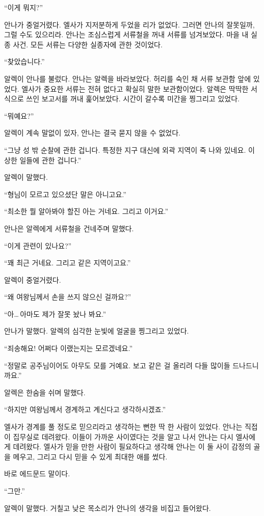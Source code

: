 ``이게 뭐지?''

안나가 중얼거렸다. 엘사가 지저분하게 두었을 리가 없었다. 그러면 안나의 잘못일까, 그럴 수도 있으리라. 안나는 조심스럽게 서류철을 꺼내 서류를 넘겨보았다. 마을 내 실종 사건. 모든 서류는 다양한 실종자에 관한 것이었다.

``찾았습니다.''

알렉이 안나를 불렀다. 안나는 알렉을 바라보았다. 허리를 숙인 채 서류 보관함 앞에 있었다. 엘사가 중요한 서류는 전혀 없다고 확실히 말한 보관함이었다. 알렉은 딱딱한 서식으로 쓰인 보고서를 꺼내 훑어보았다. 시간이 갈수록 미간을 찡그리고 있었다.

``뭐예요?''

알렉이 계속 말없이 있자, 안나는 결국 묻지 않을 수 없었다.

``그냥 성 밖 순찰에 관한 겁니다. 특정한 지구 대신에 외곽 지역이 죽 나와 있네요. 이상한 일들에 관한 겁니다.''

알렉이 말했다.

``형님이 모르고 있으셨단 말은 아니고요.''

``최소한 뭘 알아봐야 할진 아는 거네요. 그리고 이거요.''

안나은 알렉에게 서류철을 건네주며 말했다.

``이게 관련이 있나요?''

`` 꽤 최근 거네요. 그리고 같은 지역이고요.''

알렉이 중얼거렸다.

``왜 여왕님께서 손을 쓰지 않으신 걸까요?''

``아\ldots\,아마도 제가 잘못 놨나 봐요.''

안나가 말했다. 알렉의 심각한 눈빛에 얼굴을 찡그리고 있었다.

``죄송해요! 어쩌다 이랬는지는 모르겠네요.''

``정말로 공주님이어도 아무도 모를 거예요. 보고 같은 걸 올리려 다들 많이들 드나드니까요.''

알렉은 한숨을 쉬며 말했다.

``하지만 여왕님께서 경계하고 계신다고 생각하시겠죠.''

엘사가 경계를 풀 정도로 믿으리라고 생각하는 뻔한 딱 한 사람이 있었다. 안나는 직접 이 집무실로 데려왔다. 이들이 가까운 사이였다는 것을 알고 나서 안나는 다시 엘사에게 데려왔다. 엘사가 믿을 만한 사람이 필요하다고 생각해 안나는 이 둘 사이 감정의 골을 메우고, 그리고 다시 믿을 수 있게 최대한 애를 썼다.

바로 에드문드 말이다.

``그만.''

알렉이 말했다. 거칠고 낮은 목소리가 안나의 생각을 비집고 들어왔다.

